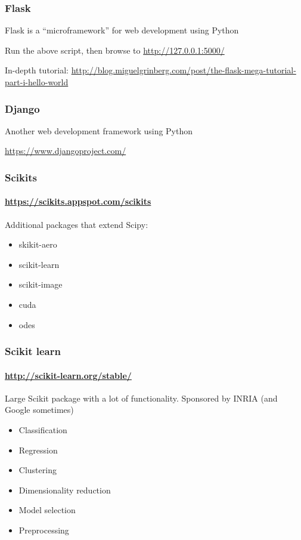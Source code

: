 


\begin{frame}\frametitle{Flask}

Flask is a ``microframework'' for web development using Python


Run the above script, then browse to \url{http://127.0.0.1:5000/}

\vfill

In-depth tutorial: \url{http://blog.miguelgrinberg.com/post/the-flask-mega-tutorial-part-i-hello-world}

\end{frame}

\begin{frame}\frametitle{Django}

Another web development framework using Python

\url{https://www.djangoproject.com/}

\end{frame}

\begin{frame}\frametitle{Scikits}
    \framesubtitle{\url{https://scikits.appspot.com/scikits}}

    Additional packages that extend Scipy:

    \begin{itemize}
        \item skikit-aero
        \item scikit-learn
        \item scikit-image
        \item cuda
        \item odes
    \end{itemize}

\end{frame}

\begin{frame}\frametitle{Scikit learn}
    \framesubtitle{\url{http://scikit-learn.org/stable/}}

    Large Scikit package with a lot of functionality.
    Sponsored by INRIA (and Google sometimes)

    \begin{itemize}
        \item Classification
        \item Regression
        \item Clustering
        \item Dimensionality reduction
        \item Model selection
        \item Preprocessing
    \end{itemize}

\end{frame}


